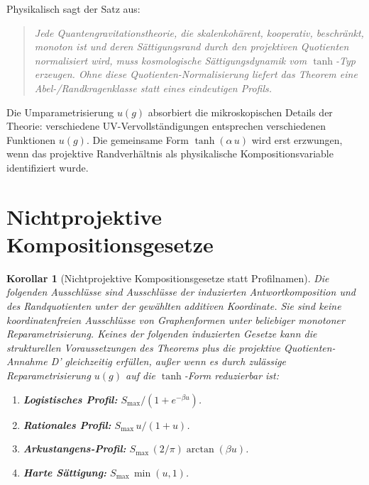 \documentclass[aps,prd,twocolumn,superscriptaddress,nofootinbib]{revtex4-2}
\newtheorem{corollary}{Korollar}
\begin{document}
Physikalisch sagt der Satz aus:
\begin{quote}
\textit{Jede Quantengravitationstheorie, die skalenkohärent, kooperativ, beschränkt, monoton ist und deren Sättigungsrand durch den projektiven Quotienten normalisiert wird, muss kosmologische Sättigungsdynamik vom $\tanh$-Typ erzeugen. Ohne diese Quotienten-Normalisierung liefert das Theorem eine Abel-/Randkragenklasse statt eines eindeutigen Profils.}
\end{quote}

Die Umparametrisierung $u(g)$ absorbiert die mikroskopischen Details der Theorie: verschiedene UV-Vervollständigungen entsprechen verschiedenen Funktionen $u(g)$. Die gemeinsame Form $\tanh(\alpha\,u)$ wird erst erzwungen, wenn das projektive Randverhältnis als physikalische Kompositionsvariable identifiziert wurde.



\section{Nichtprojektive Kompositionsgesetze}
\label{sec:exclusion}

\begin{corollary}[Nichtprojektive Kompositionsgesetze statt Profilnamen]
\label{cor:exclusion}
Die folgenden Ausschlüsse sind Ausschlüsse der induzierten Antwortkomposition und des Randquotienten unter der gewählten additiven Koordinate. Sie sind keine koordinatenfreien Ausschlüsse von Graphenformen unter beliebiger monotoner Reparametrisierung. Keines der folgenden induzierten Gesetze kann die strukturellen Voraussetzungen des Theorems plus die projektive Quotienten-Annahme D' gleichzeitig erfüllen, außer wenn es durch zulässige Reparametrisierung $u(g)$ auf die $\tanh$-Form reduzierbar ist:
\begin{enumerate}
\item[(i)] \textbf{Logistisches Profil:} $S_{\max}/(1 + e^{-\beta u})$.
\item[(ii)] \textbf{Rationales Profil:} $S_{\max}\,u/(1 + u)$.
\item[(iii)] \textbf{Arkustangens-Profil:} $S_{\max}\,(2/\pi)\arctan(\beta u)$.
\item[(iv)] \textbf{Harte Sättigung:} $S_{\max}\,\min(u, 1)$.
\end{enumerate}
\end{corollary}
\end{document}
